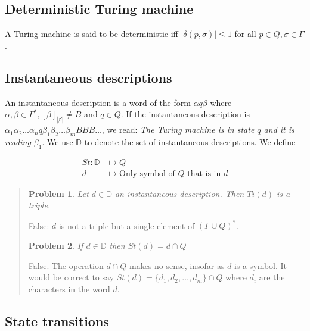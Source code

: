 \documentclass[a4paper, 12pt]{article}
\newtheorem{problem}{Problem}
\newtheorem{problem}{Problem}
\begin{document}
\subsection{Deterministic Turing machine}

A Turing machine is said to be deterministic iff $|\delta(p, \sigma)| \leq 1$
for all $p \in Q, \sigma \in \Gamma$. 

\subsection{Instantaneous descriptions}

An instantaneous description is a word of the form $\alpha q \beta $ where
$\alpha, \beta \in \Gamma^{*}, [\beta]_{|\beta |} \neq B$ and $q \in Q$. If the
instantaneous description is $\alpha_1 \alpha_2 \ldots \alpha_n q \beta_1
\beta_2 \ldots \beta_m B B B \ldots$, we read: \textit{The Turing
machine is in state $q$ and it is reading $\beta_1$}. We use $\mathbb{D}$ to
denote the set of instantaneous descriptions. We define 

\begin{align*}
    St : \mathbb{D} &\mapsto  Q \\ 
    d &\mapsto \text{Only symbol of $Q$ that is in $d$}
\end{align*}


\small
\begin{quote}

\begin{problem}
    Let $d \in \mathbb{D}$ an instantaneous description. Then $Ti(d)$ is a
    triple.
\end{problem}

False: $d$ is not a triple but a single element of $(\Gamma \cup Q)^{*}$.

\begin{problem}
    If $d \in \mathbb{D}$ then $St(d) = d \cap Q$
\end{problem}

False. The operation $d \cap Q$ makes no sense, insofar as $d$ is a symbol. It
would be correct to say $St(d) = \{d_1, d_2, \ldots, d_m\} \cap Q$ where $d_i$ are
the characters in the word $d$.


\end{quote}
\normalsize

\subsection{State transitions}
\end{document}
